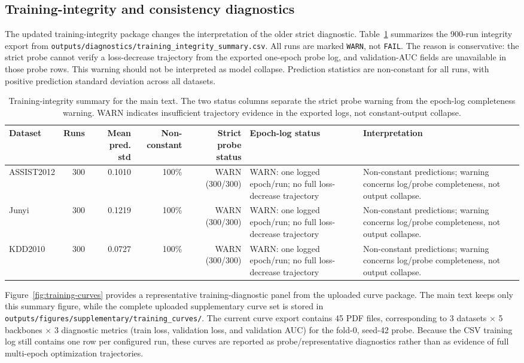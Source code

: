 \documentclass[11pt,a4paper]{article}
\begin{document}
\subsection{Training-integrity and consistency diagnostics}
The updated training-integrity package changes the interpretation of the older strict diagnostic. Table~\ref{tab:training} summarizes the 900-run integrity export from \texttt{outputs/diagnostics/training\_integrity\_summary.csv}. All runs are marked \texttt{WARN}, not \texttt{FAIL}. The reason is conservative: the strict probe cannot verify a loss-decrease trajectory from the exported one-epoch probe log, and validation-AUC fields are unavailable in those probe rows. This warning should not be interpreted as model collapse. Prediction statistics are non-constant for all runs, with positive prediction standard deviation across all datasets.

\begin{table}[H]
\centering
\caption{Training-integrity summary for the main text. The two status columns separate the strict probe warning from the epoch-log completeness warning. WARN indicates insufficient trajectory evidence in the exported logs, not constant-output collapse.}
\label{tab:training}
\scriptsize
\begin{tabularx}{\textwidth}{lrrrrXX}
\toprule
Dataset & Runs & Mean pred. std & Non-constant & Strict probe status & Epoch-log status & Interpretation \\
\midrule
ASSIST2012 & 300 & 0.1010 & 100\% & WARN (300/300) & WARN: one logged epoch/run; no full loss-decrease trajectory & Non-constant predictions; warning concerns log/probe completeness, not output collapse. \\
Junyi & 300 & 0.1219 & 100\% & WARN (300/300) & WARN: one logged epoch/run; no full loss-decrease trajectory & Non-constant predictions; warning concerns log/probe completeness, not output collapse. \\
KDD2010 & 300 & 0.0727 & 100\% & WARN (300/300) & WARN: one logged epoch/run; no full loss-decrease trajectory & Non-constant predictions; warning concerns log/probe completeness, not output collapse. \\
\bottomrule
\end{tabularx}
\end{table}

Figure~\ref{fig:training-curves} provides a representative training-diagnostic panel from the uploaded curve package. The main text keeps only this summary figure, while the complete uploaded supplementary curve set is stored in \texttt{outputs/figures/supplementary/training\_curves/}. The current curve export contains 45 PDF files, corresponding to 3 datasets $\times$ 5 backbones $\times$ 3 diagnostic metrics (train loss, validation loss, and validation AUC) for the fold-0, seed-42 probe. Because the CSV training log still contains one row per configured run, these curves are reported as probe/representative diagnostics rather than as evidence of full multi-epoch optimization trajectories.
\end{document}
